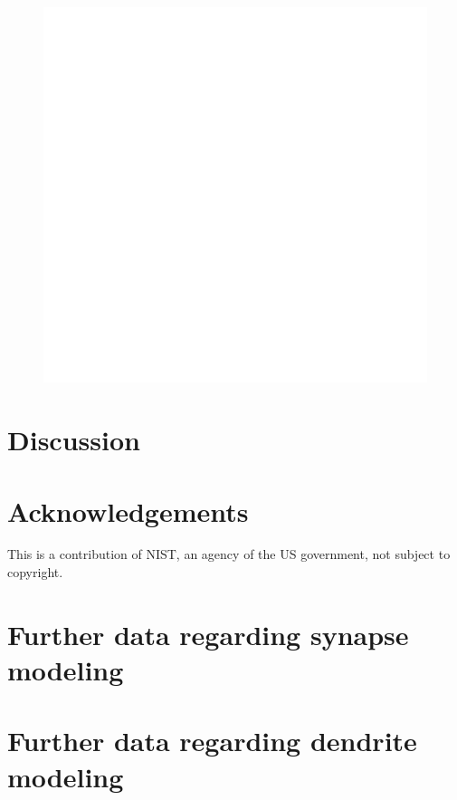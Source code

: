 \documentclass[twocolumn]{article}
\begin{document}
\begin{figure}[h!]
\includegraphics[width=17.2cm]{figures/_fig__point_neuron__nine_synapses__data.pdf}
\end{figure}

\section{\label{sec:discussion}Discussion}

\vspace{1em}
\section{\label{sec:acknowledgements}Acknowledgements}
\noindent This is a contribution of NIST, an agency of the US government, not subject to copyright.

\appendix

\section{\label{apx:synapses}Further data regarding synapse modeling}

\section{\label{apx:dendrites}Further data regarding dendrite modeling}
\end{document}

